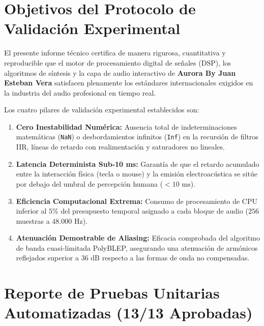 \documentclass[11pt,a4paper]{article}
\begin{document}
\newpage
\tableofcontents
\newpage

\section{Objetivos del Protocolo de Validación Experimental}

El presente informe técnico certifica de manera rigurosa, cuantitativa y reproducible que el motor de procesamiento digital de señales (DSP), los algoritmos de síntesis y la capa de audio interactivo de \textbf{Aurora By Juan Esteban Vera} satisfacen plenamente los estándares internacionales exigidos en la industria del audio profesional en tiempo real.

Los cuatro pilares de validación experimental establecidos son:
\begin{enumerate}[leftmargin=1.5cm]
    \item \textbf{Cero Inestabilidad Numérica:} Ausencia total de indeterminaciones matemáticas (\texttt{NaN}) o desbordamientos infinitos (\texttt{Inf}) en la recursión de filtros IIR, líneas de retardo con realimentación y saturadores no lineales.
    \item \textbf{Latencia Determinista Sub-10 ms:} Garantía de que el retardo acumulado entre la interacción física (tecla o mouse) y la emisión electroacústica se sitúe por debajo del umbral de percepción humana ($< 10\text{ ms}$).
    \item \textbf{Eficiencia Computacional Extrema:} Consumo de procesamiento de CPU inferior al $5\%$ del presupuesto temporal asignado a cada bloque de audio ($256$ muestras a $48.000\text{ Hz}$).
    \item \textbf{Atenuación Demostrable de Aliasing:} Eficacia comprobada del algoritmo de banda cuasi-limitada PolyBLEP, asegurando una atenuación de armónicos reflejados superior a $36\text{ dB}$ respecto a las formas de onda no compensadas.
\end{enumerate}

\section{Reporte de Pruebas Unitarias Automatizadas (13/13 Aprobadas)}
\end{document}
